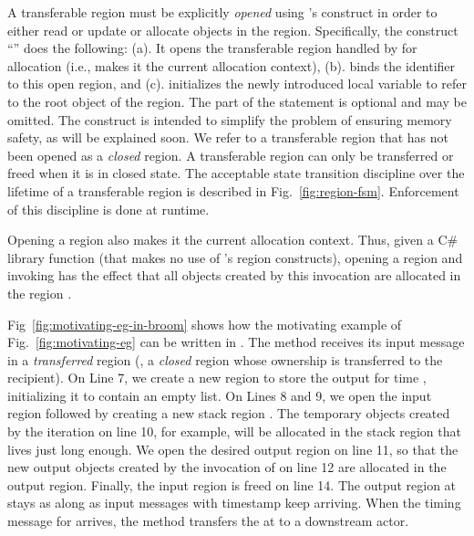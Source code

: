 A transferable region must be
explicitly \emph{opened} using \name's  construct in order to
either read or update or allocate objects in the region.
Specifically, the construct ``'' does the
following: (a). It opens the transferable region handled by 
for allocation (i.e., makes it the current allocation context), (b).
binds the identifier  to this open region, and (c). initializes
the newly introduced local variable  to refer to the root object
of the region.  The  part of the statement is optional and may
be omitted.  The  construct is intended to simplify the
problem of ensuring memory safety, as will be explained soon.  We
refer to a transferable region that has not been opened as a
\emph{closed} region. A transferable region can only be transferred or
freed when it is in closed state. The acceptable state transition
discipline over the lifetime of a transferable region is described
in Fig.~\ref{fig:region-fsm}. Enforcement of this discipline is done
at runtime.

Opening a region also makes it the current allocation context.
Thus, given a  C\# library function  (that makes no use of \name's region constructs),
opening a region  and invoking  has the effect that all objects created by this
invocation are allocated in the region .

Fig~\ref{fig:motivating-eg-in-broom} shows how the motivating example
of Fig.~\ref{fig:motivating-eg} can be written in \name. The
 method receives its input message in a
\emph{transferred} region (\ie, a \emph{closed} region whose ownership
is transferred to the recipient). On Line 7, we create a new region to
store the output for time , initializing it to contain an empty
list. On Lines 8 and 9, we open the input region  followed by
creating a new stack region . The temporary objects created by
the iteration on line 10, for example, will be allocated in the stack
region  that lives just long enough.  We open the desired output
region on line 11, so that the new output objects created by the
invocation of  on line 12 are allocated in the output
region.  Finally, the input region is freed on line 14. The output
region at  stays as along as input messages with timestamp
 keep arriving. When the timing message for  arrives, the
 method transfers the  at  to a
downstream actor.


